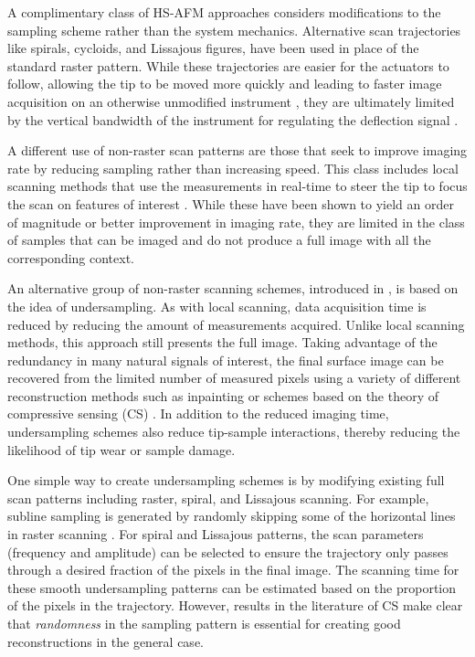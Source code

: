 \documentclass[journal]{IEEEtran}
\begin{document}
A complimentary class of HS-AFM approaches considers modifications to
the sampling scheme rather than the system mechanics. Alternative scan
trajectories like spirals, cycloids, and Lissajous figures, have been
used in place of the standard raster pattern. While these trajectories are
easier for the actuators to follow, allowing the tip to be moved more
quickly and leading to faster image acquisition on an otherwise
unmodified instrument
\cite{Bazaei:2017dm,Wu:2015dt,Rana:2014bj,Tuma:2012hv,Yong:2010gm}, they
are ultimately limited by the vertical bandwidth of
the instrument for regulating the deflection signal \cite{Teo:2016ev}.

A different use of non-raster scan patterns are those that seek to improve
imaging rate by reducing sampling rather than increasing speed. This class
includes local scanning methods that use the measurements in real-time to
steer the tip to focus the scan on features of
interest \cite{Hartman:2018ja,Wen:2018fl,Zhang:2015cf,Huang:2014dw}.
While these have been shown to yield an order of magnitude or better
improvement in imaging rate, they are limited in the class of samples
that can be imaged and do not produce a full image with all the corresponding context.
	
An alternative group of non-raster scanning schemes, introduced in
\cite{song2011video,andersson2012non}, is based on the idea of
undersampling. As with local scanning, data acquisition time is
reduced by reducing the amount of measurements acquired. Unlike local
scanning methods, this approach still presents the full image. Taking
advantage of the redundancy in many natural signals of interest, the
final surface image can be recovered from the limited number of
measured pixels using a variety of different reconstruction methods
such as inpainting or schemes based on the theory of compressive
sensing (CS) \cite{chen2013enhancement,luo2015comparison}. In addition
to the reduced imaging time, undersampling schemes also reduce
tip-sample interactions, thereby reducing the likelihood of tip wear
or sample damage.
	
One simple way to create undersampling schemes is by modifying
existing full scan patterns including raster, spiral, and Lissajous
scanning. For example, subline sampling is generated by randomly
skipping some of the horizontal lines in raster scanning
\cite{han2018reconstruction,chen2013enhancement}. For spiral and
Lissajous patterns, the scan parameters (frequency and amplitude) can
be selected to ensure the trajectory only passes through a desired
fraction of the pixels in the final image. The scanning time for these
smooth undersampling patterns can be estimated based on the proportion
of the pixels in the trajectory. However, results in the literature of
CS make clear that \textit{randomness} in the sampling pattern is
essential for creating good reconstructions in the general case. %
	
\end{document}
